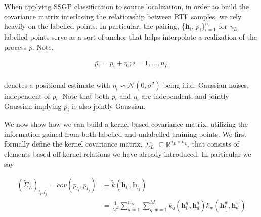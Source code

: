 \documentclass{article}
\begin{document}
When applying SSGP classification to source localization, in order to build the covariance matrix interlacing the relationship between RTF samples, we rely heavily on the labelled points. In particular, the pairing, \{\textbf{h}$_\textit{i}$, $\bar{\textit{p}_\textit{i}}$\}$^\textit{n$_L$}_{\textit{i}=1}$ for \textit{n$_L$} labelled points serve as a sort of anchor that helps interpolate a realization of the process \textit{p}. Note,

\begin{equation} \label{noisy_pos}
    \begin{aligned}
       \bar{\textit{p$_i$}} = \textit{p$_i$} + \textit{$\eta_i$}; i = 1,...,\textit{n$_L$}
    \end{aligned}
\end{equation} \\denotes a positional estimate with $\textit{$\eta_i$}\backsim\mathcal{N}\left(0, \textit{$\sigma^2$}\right)$ being i.i.d. Gaussian noises, independent of \textit{p$_i$}. Note that both \textit{p$_i$} and \textit{$\eta_i$} are independent, and jointly Gaussian implying $\bar{\textit{p}_\textit{i}}$ is also jointly Gaussian.

We now show how we can build a kernel-based covariance matrix, utilizing the information gained from both labelled and unlabelled training points. We first formally define the kernel covariance matrix, \textit{$\tilde{\Sigma}_L$} $\subseteq \mathbb{R}^{\textit{n$_L$}\times\textit{n$_L$}}$, that consists of elements based off kernel relations we have already introduced. In particular we say 

\begin{equation} \label{cov_element}
    \begin{aligned}
        {\left(\textit{$\tilde{\Sigma}_L$}\right)}_{l_i,l_j}= cov(\textit{p}_{l_{i}}, \textit{p}_{l_{j}}) &\equiv  \textit{$\tilde{k}$}\left(\textbf{h}_{l_{i}}, \textbf{h}_{l_{j}}\right) \\&= \frac{1}{\textit{M}^2} \sum_{d=1}^{{n}_D}\sum_{q,w=1}^{M} \textit{k$_q$}\left(\textbf{h}_{{l}_i}^q, \textbf{h}_d^q\right)\textit{k$_w$}\left(\textbf{h}_{l_j}^w, \textbf{h}_d^w\right) 
    \end{aligned}
\end{equation}
\end{document}

